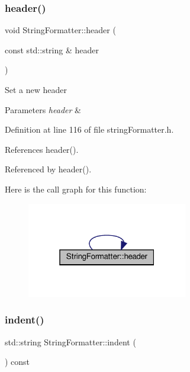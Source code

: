 \subsubsection{\texorpdfstring{header()}{header()}\hspace{0.1cm}{\footnotesize\ttfamily [2/2]}}
{\footnotesize\ttfamily void String\+Formatter\+::header (\begin{DoxyParamCaption}\item[{const std\+::string \&}]{header }\end{DoxyParamCaption})\hspace{0.3cm}{\ttfamily [inline]}}

Set a new header 
\begin{DoxyParams}{Parameters}
{\em header} & \\
\hline
\end{DoxyParams}


Definition at line 116 of file string\+Formatter.\+h.



References header().



Referenced by header().

Here is the call graph for this function\+:
\nopagebreak
\begin{figure}[H]
\begin{center}
\leavevmode
\includegraphics[width=199pt]{classStringFormatter_a03df224c2ed00ef8b01d6e8f4b65136b_cgraph}
\end{center}
\end{figure}
\mbox{\label{classStringFormatter_adeedf1dce9545fb00bc070e4caaf30aa}} 
\subsubsection{\texorpdfstring{indent()}{indent()}}
{\footnotesize\ttfamily std\+::string String\+Formatter\+::indent (\begin{DoxyParamCaption}{ }\end{DoxyParamCaption}) const\hspace{0.3cm}{\ttfamily [inline]}}

